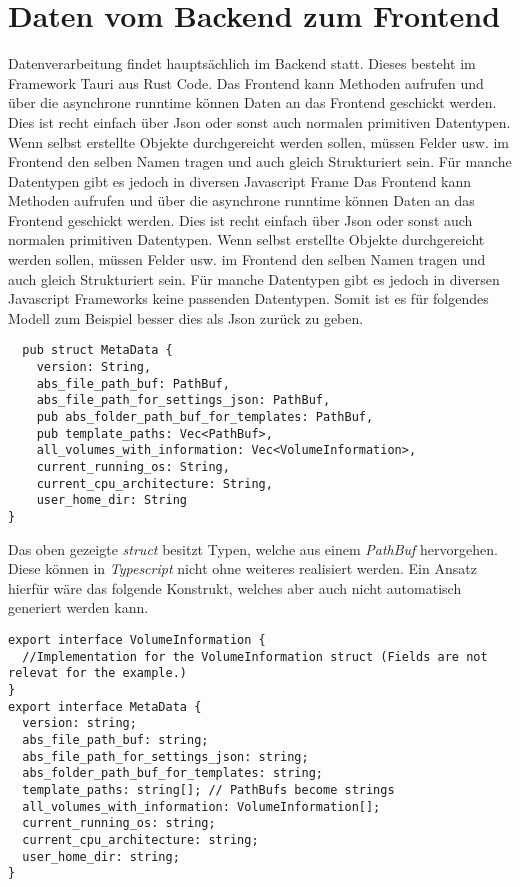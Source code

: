 \section{Daten vom Backend zum Frontend}\label{sec:Daten vom Backend zum Frontend}

Datenverarbeitung findet hauptsächlich im Backend statt. Dieses besteht im Framework Tauri \cite{tauri2025} aus Rust Code.
Das Frontend kann Methoden aufrufen und über die asynchrone runntime können Daten an das Frontend geschickt werden. Dies ist recht
einfach über Json oder sonst auch normalen primitiven Datentypen. Wenn selbst erstellte Objekte durchgereicht werden sollen,
müssen Felder usw. im Frontend den selben Namen tragen und auch gleich Strukturiert sein. Für manche Datentypen gibt es jedoch in
diversen Javascript Frame
Das Frontend kann Methoden aufrufen und über die asynchrone runntime können Daten an das Frontend geschickt werden. Dies ist recht
einfach über Json oder sonst auch normalen primitiven Datentypen. Wenn selbst erstellte Objekte durchgereicht werden sollen,
müssen Felder usw. im Frontend den selben Namen tragen und auch gleich Strukturiert sein. Für manche Datentypen gibt es jedoch in
diversen Javascript Frameworks keine passenden Datentypen. Somit ist es für folgendes Modell zum Beispiel besser dies als Json
zurück zu geben.

\begin{verbatim}
  pub struct MetaData {
    version: String,
    abs_file_path_buf: PathBuf,
    abs_file_path_for_settings_json: PathBuf,
    pub abs_folder_path_buf_for_templates: PathBuf,
    pub template_paths: Vec<PathBuf>,
    all_volumes_with_information: Vec<VolumeInformation>,
    current_running_os: String,
    current_cpu_architecture: String,
    user_home_dir: String
}
\end{verbatim}

Das oben gezeigte \textit{struct} besitzt Typen, welche aus einem \textit{PathBuf} hervorgehen. Diese können in
\textit{Typescript} nicht ohne weiteres realisiert werden. Ein Ansatz hierfür wäre das folgende Konstrukt, welches aber auch nicht
automatisch generiert werden kann.

\begin{verbatim}
export interface VolumeInformation {
  //Implementation for the VolumeInformation struct (Fields are not relevat for the example.)
}
export interface MetaData {
  version: string;
  abs_file_path_buf: string;
  abs_file_path_for_settings_json: string;
  abs_folder_path_buf_for_templates: string;
  template_paths: string[]; // PathBufs become strings
  all_volumes_with_information: VolumeInformation[];
  current_running_os: string;
  current_cpu_architecture: string;
  user_home_dir: string;
}
\end{verbatim}
